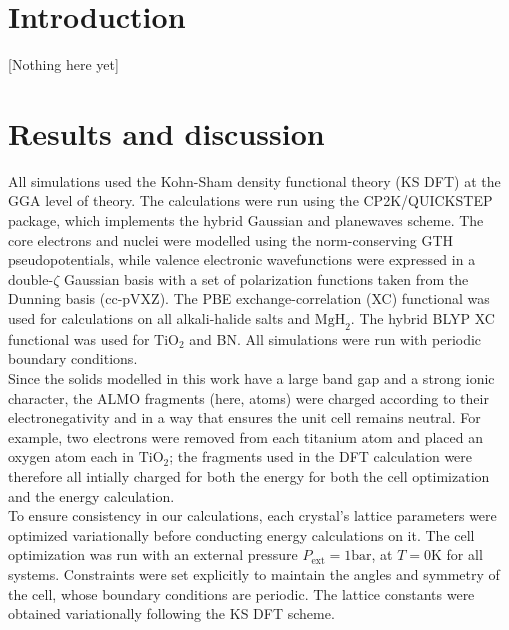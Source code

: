 \documentclass[aps,prb,twocolumn,amsmath,amssymb,superscriptaddress,longbibliography]{revtex4-1}
\begin{document}
\section{Introduction} 

[Nothing here yet]



\section*{Results and discussion}
 
All simulations used the Kohn-Sham density functional theory (KS DFT) at the GGA level of theory. 
The calculations were run using the CP2K/QUICKSTEP package\cite{cp2k}, which implements the hybrid Gaussian and planewaves scheme\cite{gpw}. 
The core electrons and nuclei were modelled using the norm-conserving GTH pseudopotentials\cite{gth1,gth2}, while valence electronic wavefunctions were expressed in a $\text{double-}\zeta$  Gaussian basis \cite{gaussian} with a set of polarization functions taken from the Dunning basis (cc-pVXZ)\cite{pol,qs}.
The PBE exchange-correlation (XC) functional\cite{pbe} was used for calculations on all alkali-halide salts and $\text{MgH}_{2}$. 
The hybrid BLYP XC functional\cite{becke,lyp} was used for $\text{TiO}_{2}$ and BN. 
All simulations were run with periodic boundary conditions.\\

Since the solids modelled in this work have a large band gap and a strong ionic character, the ALMO fragments (here, atoms) were charged according to their electronegativity and in a way that ensures the unit cell remains neutral. 
For example, two electrons were removed from each titanium atom and placed an oxygen atom each in $\text{TiO}_{2}$; the fragments used in the DFT calculation were therefore all intially charged for both the energy for both the cell optimization and the energy calculation.\\  


To ensure consistency in our calculations, each crystal's lattice parameters were optimized variationally before conducting energy calculations on it. 
The cell optimization was run with an external pressure $P_{\text{ext}} = 1 \text{bar}$, at $T = 0 \text{K}$ for all systems. 
Constraints were set explicitly to maintain the angles and symmetry of the cell, whose boundary conditions are periodic. 
The lattice constants were obtained variationally following the KS DFT scheme.\\ 
\end{document}
